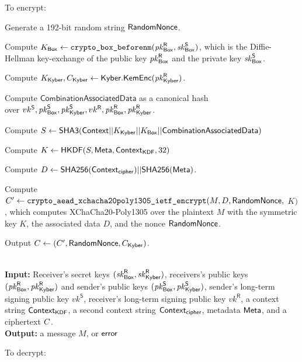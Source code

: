 \vspace{-1.5em}
To encrypt:

\vspace{-1.5em}
\begingroup
\RaggedRight
\begin{enumerate*}
\item Generate a 192-bit random string ${\sf RandomNonce}$.
\item Compute $K_{\sf Box} \leftarrow \texttt{crypto\_box\_beforenm}(\mathit{pk}_{{\sf Box}}^{\sf R}, \mathit{sk}_{{\sf Box}}^{\sf S})$, which is the Diffie-Hellman key-exchange of the public key $\mathit{pk}_{{\sf Box}}^{\sf R}$ and the private key $\mathit{sk}_{{\sf Box}}^{\sf S}$.
\item Compute $K_{\sf Kyber}, C_{\sf Kyber} \leftarrow {\sf Kyber}.\sf{KemEnc}(\mathit{pk}_{{\sf Kyber}}^{\sf R})$.
\item Compute $\textsf{CombinationAssociatedData}$ as a canonical hash \\ over $vk^\textsf{S}, \mathit{pk}_{{\sf Box}}^{\sf S}, \mathit{pk}_{{\sf Kyber}}^{\sf S}, vk^\textsf{R}, \mathit{pk}_{{\sf Box}}^{\sf R}, \mathit{pk}_{{\sf Kyber}}^{\sf R}$.
\item Compute $S \leftarrow {\sf SHA3}({\sf Context} || K_{\sf Kyber} || K_{\sf Box} || \textsf{CombinationAssociatedData})$
\item Compute $K \leftarrow {\sf HKDF}(S, {\sf Meta}, {\sf Context}_{\textsf{KDF}}, 32)$
\item Compute $D \leftarrow {\sf SHA256}({\sf Context}_\textsf{cipher}) || {\sf SHA256}({\sf Meta})$.
\item Compute $C' \leftarrow \texttt{crypto\_aead\_xchacha20poly1305\_ietf\_encrypt}(M, D,
{\sf RandomNonce},$ $K)$, which computes XChaCha20-Poly1305 over the plaintext $M$ with the symmetric key
$K$, the associated data $D$, and the nonce ${\sf RandomNonce}$.
\item Output $C \leftarrow (C', {\sf RandomNonce}, C_{\sf Kyber})$.
\end{enumerate*}
\endgroup


{\underline {\bf \cboxdecrypt}} \\
{\bf Input:} Receiver's secret keys $(\mathit{sk}_{{\sf Box}}^{\sf R},\mathit{sk}_{{\sf Kyber}}^{\sf R})$, receivers's public keys $(\mathit{pk}_{{\sf Box}}^{\sf R}, \mathit{pk}_{{\sf Kyber}}^{\sf R})$ and sender's public keys $(\mathit{pk}_{{\sf Box}}^{\sf S},\mathit{pk}_{{\sf Kyber}}^{\sf S})$, sender's long-term signing public key $vk^\textsf{S}$, receiver's long-term signing public key $vk^\textsf{R}$, a context string
${\sf Context}_\textsf{KDF}$, a second context string ${\sf Context}_\textsf{cipher}$, metadata ${\sf Meta}$,
and a ciphertext $C$. \\
{\bf Output:} a message $M$, or ${\sf error}$

To decrypt:

